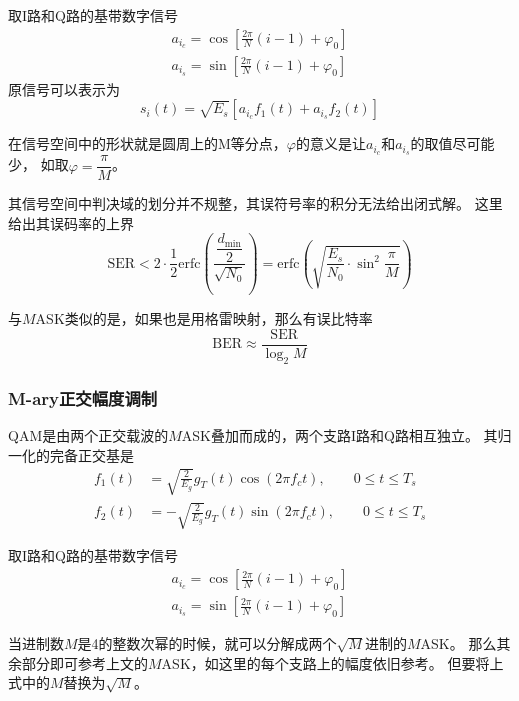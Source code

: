     取I路和Q路的基带数字信号
    \begin{align}
        a_{i_c}=\cos\left[\frac{2\pi}{N}(i-1)+\varphi_0\right]\\
        a_{i_s}=\sin\left[\frac{2\pi}{N}(i-1)+\varphi_0\right]
    \end{align}
    原信号可以表示为
    \begin{equation}
        s_i(t)=\sqrt{E_s}[a_{i_c}f_1(t)+a_{i_s}f_2(t)]
    \end{equation}

    在信号空间中的形状就是圆周上的M等分点，$\varphi$的意义是让$a_{i_c}$和$a_{i_s}$的取值尽可能少，
    如取$\varphi=\dfrac{\pi}{M}$。

    其信号空间中判决域的划分并不规整，其误符号率的积分无法给出闭式解。
    这里给出其误码率的上界
    \begin{equation}
        \text{SER}<2\cdot\frac{1}{2}\text{erfc}\left(\frac{\dfrac{d_\text{min}}{2}}{\sqrt{N_0}}\right)=\text{erfc}\left(\sqrt{\frac{E_s}{N_0}\cdot\sin^2\frac{\pi}{M}}\right)
    \end{equation}

    与$M$ASK类似的是，如果也是用格雷映射，那么有误比特率
    \begin{equation}
        \textrm{BER}\approx \frac{\mathrm{SER}}{\log_2M}
    \end{equation}

    \subsubsection{M-ary正交幅度调制}
    QAM是由两个正交载波的$M$ASK叠加而成的，两个支路I路和Q路相互独立。
    其归一化的完备正交基是
    \begin{align}
        f_1(t)&=\sqrt{\frac{2}{E_g}}g_T(t)\cos(2\pi f_ct),\hspace{2em}0\leq t\leq T_s\\
        f_2(t)&=-\sqrt{\frac{2}{E_g}}g_T(t)\sin(2\pi f_ct),\hspace{2em}0\leq t\leq T_s
    \end{align}

    取I路和Q路的基带数字信号
    \begin{align}
        a_{i_c}=\cos\left[\frac{2\pi}{N}(i-1)+\varphi_0\right]\\
        a_{i_s}=\sin\left[\frac{2\pi}{N}(i-1)+\varphi_0\right]
    \end{align}

    当进制数$M$是4的整数次幂的时候，就可以分解成两个$\sqrt{M}$进制的$M$ASK。
    那么其余部分即可参考上文的$M$ASK，如这里的每个支路上的幅度依旧参考。
    但要将上式中的$M$替换为$\sqrt{M}$。

